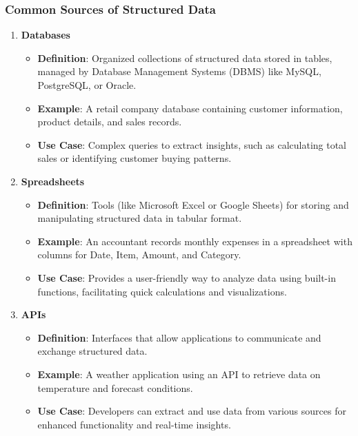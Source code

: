 \documentclass[aspectratio=169]{beamer}
\begin{document}
\begin{frame}[fragile]
  \frametitle{Common Sources of Structured Data}
  \begin{enumerate}
    \item \textbf{Databases}
      \begin{itemize}
        \item \textbf{Definition}: Organized collections of structured data stored in tables, managed by Database Management Systems (DBMS) like MySQL, PostgreSQL, or Oracle.
        \item \textbf{Example}: A retail company database containing customer information, product details, and sales records.
        \item \textbf{Use Case}: Complex queries to extract insights, such as calculating total sales or identifying customer buying patterns.
      \end{itemize}
    
    \item \textbf{Spreadsheets}
      \begin{itemize}
        \item \textbf{Definition}: Tools (like Microsoft Excel or Google Sheets) for storing and manipulating structured data in tabular format.
        \item \textbf{Example}: An accountant records monthly expenses in a spreadsheet with columns for Date, Item, Amount, and Category.
        \item \textbf{Use Case}: Provides a user-friendly way to analyze data using built-in functions, facilitating quick calculations and visualizations.
      \end{itemize}
    
    \item \textbf{APIs}
      \begin{itemize}
        \item \textbf{Definition}: Interfaces that allow applications to communicate and exchange structured data.
        \item \textbf{Example}: A weather application using an API to retrieve data on temperature and forecast conditions.
        \item \textbf{Use Case}: Developers can extract and use data from various sources for enhanced functionality and real-time insights.
      \end{itemize}
  \end{enumerate}
\end{frame}
\end{document}

